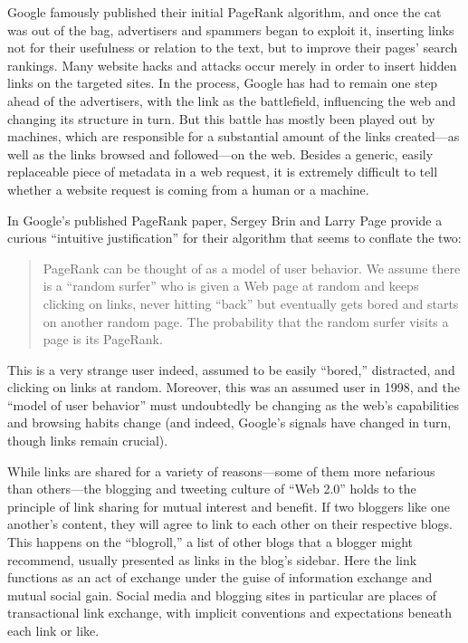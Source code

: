 
Google famously published their initial PageRank algorithm, and once the cat was out of the bag, advertisers and spammers began to exploit it, inserting links not for their usefulness or relation to the text, but to improve their pages' search rankings. Many website hacks and attacks occur merely in order to insert hidden links on the targeted sites. In the process, Google has had to remain one step ahead of the advertisers, with the link as the battlefield, influencing the web and changing its structure in turn. But this battle has mostly been played out by machines, which are responsible for a substantial amount of the links created---as well as the links browsed and followed---on the web. Besides a generic, easily replaceable piece of metadata in a web request, it is extremely difficult to tell whether a website request is coming from a human or a machine.

In Google's published PageRank paper, Sergey Brin and Larry Page provide a curious ``intuitive justification'' for their algorithm that seems to conflate the two: \blockquote{PageRank can be thought of as a model of user behavior. We assume there is a ``random surfer'' who is given a Web page at random and keeps clicking on links, never hitting ``back'' but eventually gets bored and starts on another random page. The probability that the random surfer visits a page is its PageRank.\autocite[110]{brin_anatomy_1998}} This is a very strange user indeed, assumed to be easily ``bored,'' distracted, and clicking on links at random. Moreover, this was an assumed user in 1998, and the ``model of user behavior'' must undoubtedly be changing as the web's capabilities and browsing habits change (and indeed, Google's signals have changed in turn, though links remain crucial).

While links are shared for a variety of reasons---some of them more nefarious than others---the blogging and tweeting culture of ``Web 2.0'' holds to the principle of link sharing for mutual interest and benefit. If two bloggers like one another's content, they will agree to link to each other on their respective blogs. This happens on the ``blogroll,'' a list of other blogs that a blogger might recommend, usually presented as links in the blog's sidebar. Here the link functions as an act of exchange under the guise of information exchange and mutual social gain. Social media and blogging sites in particular are places of transactional link exchange, with implicit conventions and expectations beneath each link or like.

